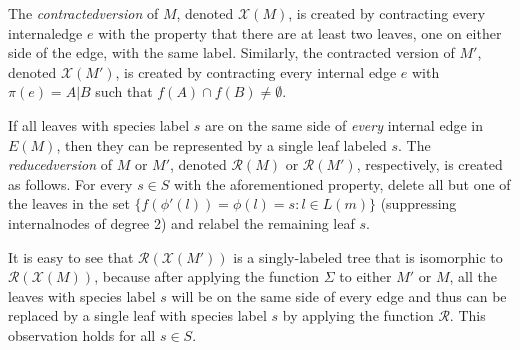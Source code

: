 \begin{definition}
\label{defn:conv}
The \emph{\gls{contractedversion}} of $M$, denoted $\mathcal{X}(M)$, is created by contracting every \gls{internaledge} $e$ with the property that there are at least two leaves, one on either side of the edge, with the same label.
Similarly, the contracted version of $M'$, denoted $\mathcal{X}(M')$, is created by contracting every internal edge $e$ with $\pi(e) = A|B$ such that $f(A) \cap f(B) \neq \emptyset$.
\end{definition}

\begin{definition}
\label{defn:redv}
If all leaves with species label $s$ are on the same side of {\em every} internal edge in $E(M)$, then they can be represented by a single leaf labeled $s$.
The \emph{\gls{reducedversion}} of $M$ or $M'$, denoted $\mathcal{R}(M)$ or $\mathcal{R}(M')$, respectively, is created as follows. 
For every $s \in S$ with the aforementioned property, delete all but one of the leaves in the set $\{ f(\phi'(l)) = \phi(l) = s : l \in L(m) \}$ (suppressing \glspl{internalnode} of degree 2) and relabel the remaining leaf $s$.
\end{definition}

It is easy to see that $\mathcal{R}(\mathcal{X}(M'))$ is a singly-labeled tree that is isomorphic to $\mathcal{R}(\mathcal{X}(M))$, because after applying the function $\Sigma$ to either $M'$ or $M$, all the leaves with species label $s$ will be on the same side of every edge and thus can be replaced by a single leaf with species label $s$ by applying the function $\mathcal{R}$. 
This observation holds for all $s \in S$.

